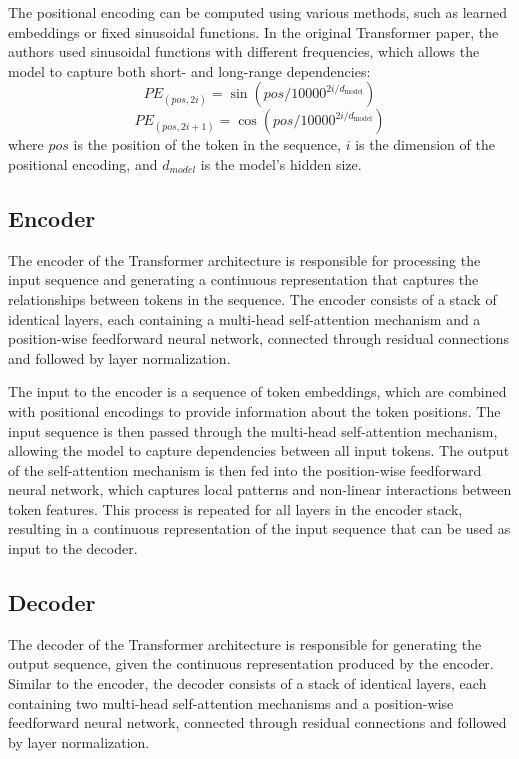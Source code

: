 \documentclass[12pt]{article}
\begin{document}
The positional encoding can be computed using various methods, such as learned embeddings or fixed sinusoidal functions. In the original Transformer paper, the authors used sinusoidal functions with different frequencies, which allows the model to capture both short- and long-range dependencies:
$$ PE_{(pos, 2i)} = \sin(pos / 10000^{2i/d_{\text{model}}})$$
$$PE_{(pos, 2i+1)} = \cos(pos / 10000^{2i/d_{\text{model}}})$$
where $pos$ is the position of the token in the sequence, $i$ is the dimension of the positional encoding, and $d_{model}$ is the model's hidden size.

\subsection{Encoder}
The encoder of the Transformer architecture is responsible for processing the input sequence and generating a continuous representation that captures the relationships between tokens in the sequence. The encoder consists of a stack of identical layers, each containing a multi-head self-attention mechanism and a position-wise feedforward neural network, connected through residual connections and followed by layer normalization.

The input to the encoder is a sequence of token embeddings, which are combined with positional encodings to provide information about the token positions. The input sequence is then passed through the multi-head self-attention mechanism, allowing the model to capture dependencies between all input tokens. The output of the self-attention mechanism is then fed into the position-wise feedforward neural network, which captures local patterns and non-linear interactions between token features. This process is repeated for all layers in the encoder stack, resulting in a continuous representation of the input sequence that can be used as input to the decoder.

\subsection{Decoder}
The decoder of the Transformer architecture is responsible for generating the output sequence, given the continuous representation produced by the encoder. Similar to the encoder, the decoder consists of a stack of identical layers, each containing two multi-head self-attention mechanisms and a position-wise feedforward neural network, connected through residual connections and followed by layer normalization.
\end{document}
